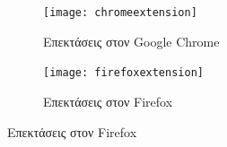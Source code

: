 \documentclass{article}
\begin{document}
\begin{figure}[H]
    \centering
    \begin{minipage}[t]{0.45\textwidth}
        \centering
        \begin{subfigure}[t]{\textwidth}
            \texttt{[image: chromeextension]}
        \caption{Επεκτάσεις στον Google Chrome}
        \label{Fig:chromeextension}
        \end{subfigure}
        \vspace{\fill}
    \end{minipage}
    \hfill
    \begin{minipage}[t]{0.45\textwidth}
        \centering
        \begin{subfigure}[t]{\textwidth}
            \texttt{[image: firefoxextension]}
            \caption{Επεκτάσεις στον Firefox}
            \label{Fig:firefoxextension}
        \end{subfigure}
    \end{minipage}
\end{figure}
\end{document}
